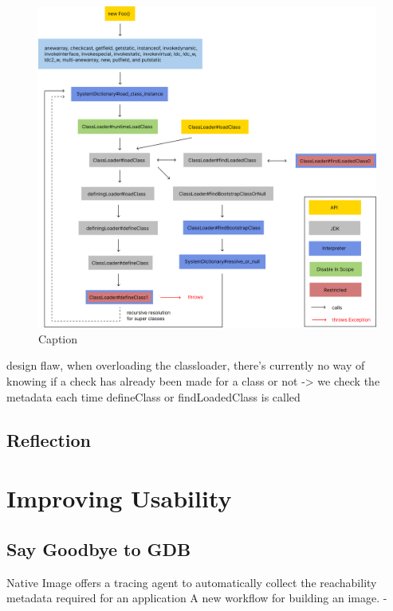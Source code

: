 \begin{figure}
    \centering
    \includegraphics[scale=0.55]{resources/loadClassWithLegend.png}
    \caption{Caption}
    \label{fig:load_class}
\end{figure}


design flaw, when overloading the classloader, there's currently no way of knowing if a check has already been made for a class or not -> we check the metadata each time defineClass or findLoadedClass is called
\subsection{Reflection}


\section{Improving Usability}

\subsection{Say Goodbye to GDB}
Native Image offers a tracing agent to automatically collect the reachability metadata required for an application
A new workflow for building an image.
-
